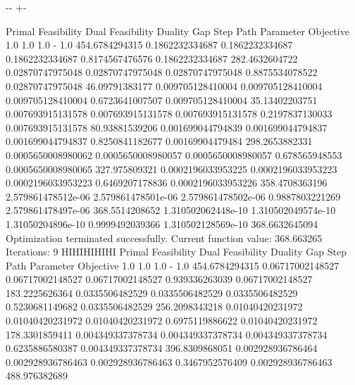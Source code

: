 \documentclass[letterpaper,10pt,english]{sphinxmanual}
\newlength\nbsphinxcodecellspacing
\begin{document}
{

\kern-\sphinxverbatimsmallskipamount\kern-\baselineskip
\kern+\FrameHeightAdjust\kern-\fboxrule
\vspace{\nbsphinxcodecellspacing}

\begin{sphinxVerbatim}[commandchars=\\\{\}]
Primal Feasibility  Dual Feasibility    Duality Gap         Step             Path Parameter      Objective
1.0                 1.0                 1.0                 -                1.0                 454.6784294315
0.1862232334687     0.1862232334687     0.1862232334687     0.8174567476576  0.1862232334687     282.4632604722
0.02870747975048    0.02870747975048    0.02870747975048    0.8875534078522  0.02870747975048    46.09791383177
0.009705128410004   0.009705128410004   0.009705128410004   0.6723641007507  0.009705128410004   35.13402203751
0.007693915131578   0.007693915131578   0.007693915131578   0.2197837130033  0.007693915131578   80.93881539206
0.001699044794839   0.001699044794837   0.001699044794837   0.8250841182677  0.00169904479484    298.2653882331
0.0005650008980062  0.0005650008980057  0.0005650008980057  0.678565948553   0.0005650008980065  327.975809321
0.0002196033953225  0.0002196033953223  0.0002196033953223  0.6469207178836  0.0002196033953226  358.4708363196
2.579861478512e-06  2.579861478501e-06  2.579861478502e-06  0.9887803221269  2.579861478497e-06  368.5514208652
1.310502062448e-10  1.310502049574e-10  1.31050204896e-10   0.9999492039366  1.310502128569e-10  368.6632645094
Optimization terminated successfully.
         Current function value: 368.663265
         Iterations: 9
HIHIHIHIHI
Primal Feasibility  Dual Feasibility    Duality Gap         Step             Path Parameter      Objective
1.0                 1.0                 1.0                 -                1.0                 454.6784294315
0.06717002148527    0.06717002148527    0.06717002148527    0.939336263039   0.06717002148527    183.2225626364
0.0335506482529     0.0335506482529     0.0335506482529     0.5230681149682  0.0335506482529     256.2098343218
0.01040420231972    0.01040420231972    0.01040420231972    0.6975119886622  0.01040420231972    178.3301859411
0.004349337378734   0.004349337378734   0.004349337378734   0.6235886580387  0.004349337378734   396.8309868051
0.002928936786464   0.002928936786463   0.002928936786463   0.3467952576409  0.002928936786463   488.976382689

\end{sphinxVerbatim}}
\end{document}
